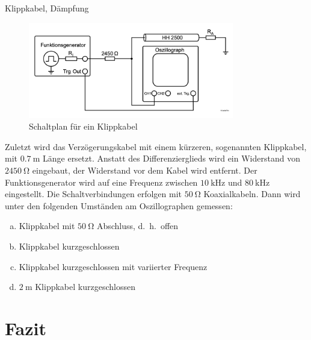 \documentclass[ngerman]{scrartcl}
\theoremstyle{definition}
\begin{document}
		\begin{aufgabe}{Klippkabel, Dämpfung}
			\begin{figure}[h!]
				\centering
				\includegraphics[width=0.8\textwidth]{Aufbau_1_4_Klippkabel.png}
				\caption{Schaltplan für ein Klippkabel~\cite{anleitung}}
				\label{fig:aufbau_1_4_klippkabel}
			\end{figure}
			Zuletzt wird das Verzögerungskabel mit einem kürzeren, sogenannten Klippkabel, mit $\SI{0.7}{\meter}$ Länge ersetzt. Anstatt des Differenzierglieds wird ein Widerstand von $\SI{2450}{\ohm}$ eingebaut, der Widerstand vor dem Kabel wird entfernt. Der Funktionsgenerator wird auf eine Frequenz zwischen $\SI{10}{\kilo\hertz}$ und $\SI{80}{\kilo\hertz}$ eingestellt. Die Schaltverbindungen erfolgen mit $\SI{50}{\ohm}$ Koaxialkabeln. Dann wird unter den folgenden Umständen am Oszillographen gemessen:
			\begin{enumerate}[(a)]
				\item Klippkabel mit $\SI{50}{\ohm}$ Abschluss, d.\ h.\ offen
				\item Klippkabel kurzgeschlossen
				\item Klippkabel kurzgeschlossen mit variierter Frequenz
				\item $\SI{2}{\meter}$ Klippkabel kurzgeschlossen 
			\end{enumerate}
		\end{aufgabe}
		

	\section{Fazit}
	\printbibliography
\end{document}
